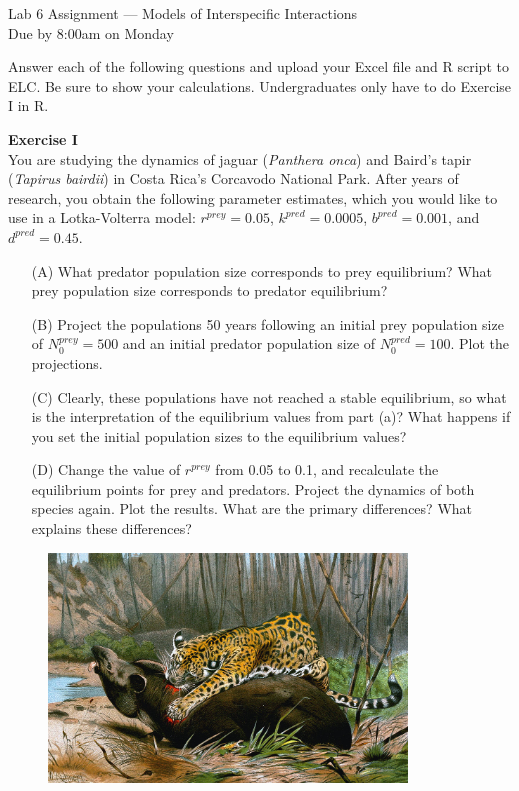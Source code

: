 \documentclass[12pt]{article}\usepackage[]{graphicx}\usepackage[]{xcolor}
\begin{document}
{
  \Large
  \centering
  Lab 6 Assignment --- Models of Interspecific Interactions \\
  Due by 8:00am on Monday \par
}

Answer each of the following questions and upload your Excel file and
R script to ELC. Be sure to show your calculations. Undergraduates
only have to do Exercise I in R.  \\


\vspace{6pt}

{\bf Exercise I \\}
You are studying the dynamics of jaguar (\textit{Panthera onca}) and Baird's
tapir (\textit{Tapirus bairdii}) in Costa Rica's Corcavodo National Park. After
years of research, you obtain the following parameter estimates, which
you would like to use in a Lotka-Volterra model: $r^{prey}=0.05$,
$k^{pred}=0.0005$, $b^{pred}=0.001$, and $d^{pred}=0.45$.  
\begin{enumerate}
  \item[(A)] What predator population size corresponds to prey equilibrium?
    What prey population size corresponds to predator equilibrium? 
  \item[(B)] Project the populations 50 years following an initial prey
    population size of $N_0^{prey}=500$ and an initial predator
    population size of $N_0^{pred}=100$. Plot the projections.  
  \item[(C)] Clearly, these populations have not reached a stable
    equilibrium, so what is the interpretation of the equilibrium
    values from part (a)? What happens if you set the initial
    population sizes to the equilibrium values?  
  \item[(D)] Change the value of $r^{prey}$ from 0.05 to 0.1,
    and recalculate the equilibrium points for prey and
    predators. Project the dynamics of both species again. Plot the
    results. What are the primary differences?  What explains these
    differences? 
\end{enumerate}

\vspace{12pt}

\begin{figure}[h!]
  \centering
  \includegraphics[width=0.85\textwidth]{jaguar_killing_tapir}
  \label{fig:jag-tapir}
\end{figure}
\end{document}
